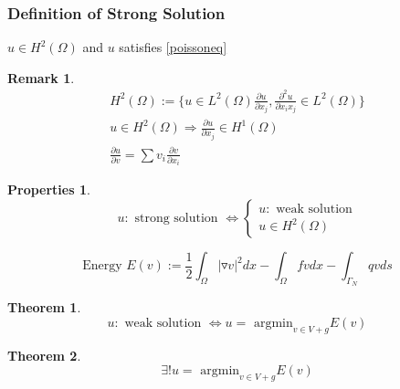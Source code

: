 \documentclass[a4paper,12pt]{article}
\newtheorem{remark}{Remark}[]
\newtheorem{prop}{Properties}
\newtheorem{theorem}{Theorem}
\begin{document}
\subsubsection{Definition of Strong Solution}
$u \in H^2(\Omega)$ and $u$ satisfies \eqref{poissoneq}
\begin{remark}
	\begin{equation}\nonumber
	\begin{aligned}
	H^2(\Omega):= \{ u\in L^2(\Omega) \frac{\partial u}{\partial x_j},\frac{\partial^2 u}{\partial x_i x_j} \in L^2(\Omega)\}\\
	u \in H^2(\Omega) \Rightarrow \frac{\partial u}{\partial x_j} \in H^1(\Omega)\\
	\frac{\partial u}{\partial v} = \sum v_i \frac{\partial v}{\partial x_i}
	\end{aligned}
	\end{equation}
\end{remark}
\begin{prop}
	\begin{equation}\nonumber
	u: \text{ strong solution } \Leftrightarrow \begin{cases}
	u: \text{ weak solution}\\
	u \in H^2(\Omega)
	\end{cases}
	\end{equation}
\end{prop}
\begin{equation}\nonumber
\text{Energy } E(v) := \frac{1}{2} \int_\Omega |\triangledown v|^2 dx - \int_\Omega fv dx - \int_{\Gamma_N} qv ds
\end{equation}
\begin{theorem}\label{theorem1}
	\begin{equation}\nonumber
	u: \text{ weak solution } \Leftrightarrow u= \text{ argmin}_{v\in V+g} E(v)
	\end{equation}
\end{theorem}
\begin{theorem}\label{theorem2}
	\begin{equation}\nonumber
	\exists! u = \text{ argmin}_{v\in V+g} E(v)
	\end{equation}
\end{theorem}
\end{document}
